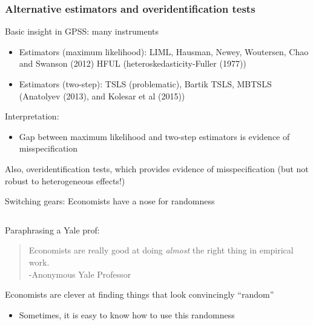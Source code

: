 \documentclass[notes,11pt, aspectratio=169]{beamer}
\newenvironment{wideitemize}{\itemize\addtolength{\itemsep}{10pt}}{\enditemize}
\begin{document}

\begin{frame}[label=overidtest]
\frametitle{Alternative estimators and overidentification tests}

Basic insight in GPSS: many instruments 
\begin{itemize}
\item Estimators (maximum likelihood): LIML, Hausman, Newey, Woutersen, Chao and Swanson (2012) HFUL (heteroskedasticity-Fuller (1977))
\item Estimators (two-step):  TSLS (problematic), Bartik TSLS, MBTSLS (Anatolyev (2013), and Kolesar et al (2015)) 
\end{itemize} 
Interpretation:
\begin{itemize}
\item Gap between maximum likelihood and two-step estimators is evidence of misspecification 
\end{itemize}
Also, overidentification tests, which provides evidence of misspecification (but not robust to heterogeneous effects!)

\end{frame}


\begin{frame}{Switching gears: Economists have a nose for randomness}
\begin{columns}[T] %
\begin{column}{.5\textwidth}
  \begin{wideitemize}
  \item Paraphrasing a Yale prof:
    \begin{quote}
      Economists are really good at doing \emph{almost} the right
      thing in empirical work.\\
      \hfill -Anonymous Yale Professor
    \end{quote}
  \item Economists are clever at finding things that look convincingly
    ``random''
    \begin{itemize}
    \item Sometimes, it is easy to know how to use this randomness
    \end{itemize}
  \end{wideitemize}
\end{column}%
\hfill%
\begin{column}{.5\textwidth}
\end{column}%
\end{columns}
\end{frame}
\end{document}
